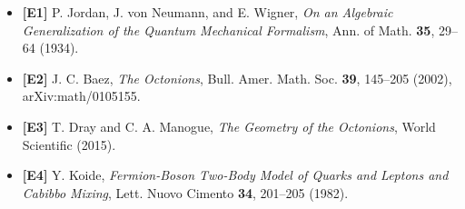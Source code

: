 \documentclass[
  a4paper,
]{article}
\providecommand{\tightlist}{%
  \setlength{\itemsep}{0pt}\setlength{\parskip}{0pt}}
\begin{document}
\begin{itemize}
\tightlist
\item
  \textbf{{[}E1{]}} P. Jordan, J. von Neumann, and E. Wigner, \emph{On
  an Algebraic Generalization of the Quantum Mechanical Formalism}, Ann.
  of Math. \textbf{35}, 29--64 (1934).
\item
  \textbf{{[}E2{]}} J. C. Baez, \emph{The Octonions}, Bull. Amer. Math.
  Soc. \textbf{39}, 145--205 (2002), arXiv:math/0105155.
\item
  \textbf{{[}E3{]}} T. Dray and C. A. Manogue, \emph{The Geometry of the
  Octonions}, World Scientific (2015).
\item
  \textbf{{[}E4{]}} Y. Koide, \emph{Fermion-Boson Two-Body Model of
  Quarks and Leptons and Cabibbo Mixing}, Lett. Nuovo Cimento
  \textbf{34}, 201--205 (1982).
\end{itemize}
\end{document}
